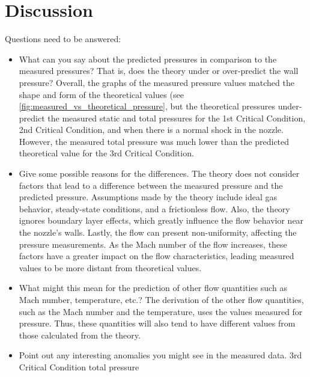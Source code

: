 \chapter{Discussion}
\label{cp:discussion}

Questions need to be answered:

\begin{itemize}
  \item What can you say about the predicted pressures in comparison to the measured pressures? That is, does the theory under or over‐predict the wall pressure?
  Overall, the graphs of the measured pressure values matched the shape and form of the theoretical values (see \autoref{fig:measured_vs_theoretical_pressure}, but the theoretical pressures under-predict the measured static and total pressures for the 1st Critical Condition, 2nd Critical Condition, and when there is a normal shock in the nozzle. However, the measured total pressure was much lower than the predicted theoretical value for the 3rd Critical Condition.
  \item Give some possible reasons for the differences.
  The theory does not consider factors that lead to a difference between the measured pressure and the predicted pressure. Assumptions made by the theory include ideal gas behavior, steady-state conditions, and a frictionless flow. Also, the theory ignores boundary layer effects, which greatly influence the flow behavior near the nozzle's walls. Lastly, the flow can present non-uniformity, affecting the pressure measurements. As the Mach number of the flow increases, these factors have a greater impact on the flow characteristics, leading measured values to be more distant from theoretical values.
  \item What might this mean for the prediction of other flow quantities such as Mach number, temperature, etc.?
  The derivation of the other flow quantities, such as the Mach number and the temperature, uses the values measured for pressure. Thus, these quantities will also tend to have different values from those calculated from the theory.
  \item Point out any interesting anomalies you might see in the measured data.
  3rd Critical Condition total pressure
\end{itemize}


  